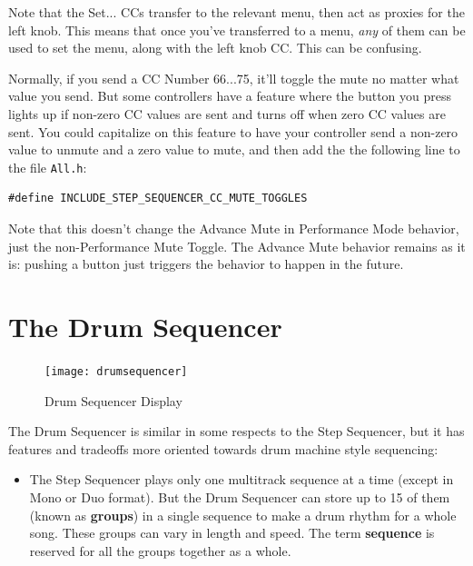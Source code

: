 \documentclass{article}
\begin{document}
\vspace{1em}
\noindent Note that the Set... CCs transfer to the relevant menu, then act as proxies for the left knob.  This means that once you've transferred to a menu, {\it any} of them can be used to set the menu, along with the left knob CC.  This can be confusing.

Normally, if you send a CC Number 66...75, it'll toggle the mute no matter what value you send.  But some controllers have a feature where the button you press lights up if non-zero CC values are sent and turns off when zero CC values are sent.  You could capitalize on this feature to have your controller send a non-zero value to unmute and a zero value to mute, and then add the the following line to the file {\tt All.h}:

\begin{verbatim}
#define INCLUDE_STEP_SEQUENCER_CC_MUTE_TOGGLES
\end{verbatim}

Note that this doesn't change the Advance Mute in Performance Mode behavior, just the non-Performance Mute Toggle.  The Advance Mute behavior remains as it is: pushing a button just triggers the behavior to happen in the future.

\clearpage



\section {The Drum Sequencer}
\label{drumsequencersec}

\vspace{1em}

\begin{figure}
\vspace{-3.5em}\texttt{[image: drumsequencer]}
\vspace{-1em}\caption{\small Drum Sequencer Display}\vspace{-2em}
\label{drumsequencer}
\end{figure}

The Drum Sequencer is similar in some respects to the Step Sequencer, but it has features and tradeoffs more oriented towards drum machine style sequencing:

\begin{itemize}
\item The Step Sequencer plays only one multitrack sequence at a time (except in Mono or Duo format).   But the Drum Sequencer can store up to 15 of them (known as {\bf groups}) in a single sequence to make a drum rhythm for a whole song.  These groups can vary in length and speed.  The term {\bf sequence} is reserved for all the groups together as a whole.
\end{itemize}
\end{document}
